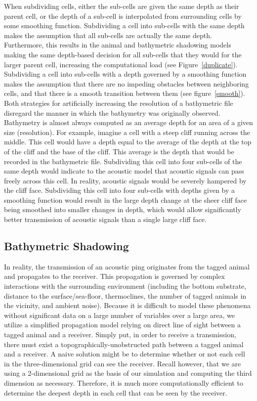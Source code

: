 When subdividing cells, either the sub-cells are given the same depth as their parent cell, or the depth of a sub-cell is interpolated from surrounding cells by some smoothing function.  Subdividing a cell into sub-cells with the same depth makes the assumption that all sub-cells are actually the same depth.  Furthermore, this results in the animal and bathymetric shadowing models making the same depth-based decision for all sub-cells that they would for the larger parent cell, increasing the computational load (see Figure~\ref{duplicate}).  Subdividing a cell into sub-cells with a depth governed by a smoothing function makes the assumption that there are no impeding obstacles between neighboring cells, and that there is a smooth transition between them (see figure~\ref{smooth}).  Both strategies for artificially increasing the resolution of a bathymetric file disregard the manner in which the bathymetry was originally observed.  Bathymetry is almost always computed as an average depth for an area of a given size (resolution).  For example, imagine a cell with a steep cliff running across the middle.  This cell would have a depth equal to the average of the depth at the top of the cliff and the base of the cliff.  This average is the depth that would be recorded in the bathymetric file.  Subdividing this cell into four sub-cells of the same depth would indicate to the acoustic model that acoustic signals can pass freely across this cell.  In reality, acoustic signals would be severely hampered by the cliff face.  Subdividing this cell into four sub-cells with depths given by a smoothing function would result in the large depth change at the sheer cliff face being smoothed into smaller changes in depth, which would allow significantly better transmission of acoustic signals than a single large cliff face.

 
\subsection{Bathymetric Shadowing}
\label{bathymetricShadowing}
In reality, the transmission of an acoustic ping originates from the tagged animal and propagates to the receiver.  This propagation is governed by complex interactions with the surrounding environment (including the bottom substrate, distance to the surface/sea-floor, thermoclines, the number of tagged animals in the vicinity, and ambient noise).  Because it is difficult to model these phenomena without significant data on a large number of variables over a large area, we utilize a simplified propagation model relying on direct line of sight between a tagged animal and a receiver.  Simply put, in order to receive a transmission, there must exist a topographically-unobstructed path between a tagged animal and a receiver.  A naive solution might be to determine whether or not each cell in the three-dimensional grid can see the receiver.  Recall however, that we are using a 2-dimensional grid as the basis of our simulation and computing the third dimension as necessary.  Therefore, it is much more computationally efficient to determine the deepest depth in each cell that can be seen by the receiver.


